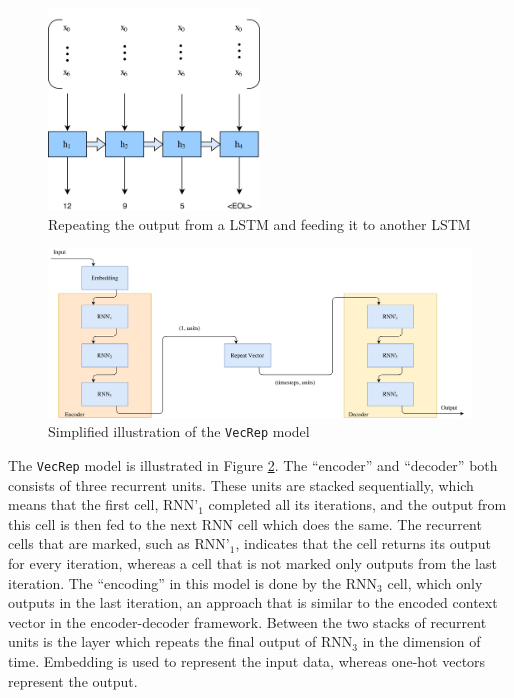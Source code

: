 \begin{figure}[ht]
    \centering
    \includegraphics[width=0.5\textwidth]{fig/development_process/lstm-vector-projection-decoder.png}
    \caption{Repeating the output from a LSTM and feeding it to another LSTM}
    \label{fig:lstm-vector-projection-decoder}
\end{figure}

\begin{figure}[!ht]
    \centering
    \includegraphics[width=1\textwidth]{fig/models/vecrep_model.png}
    \caption{Simplified illustration of the {\tt VecRep} model}
    \label{fig:vecrep_model}
\end{figure}

The {\tt VecRep} model is illustrated in Figure \ref{fig:vecrep_model}. The ``encoder'' and ``decoder'' both consists of three recurrent units. These units are stacked sequentially, which means that the first cell, \(\text{RNN'}_1\) completed all its iterations, and the output from this cell is then fed to the next RNN cell which does the same. The recurrent cells that are marked, such as \(\text{RNN'}_1\), indicates that the cell returns its output for every iteration, whereas a cell that is not marked only outputs from the last iteration. The ``encoding'' in this model is done by the \(\text{RNN}_3\) cell, which only outputs in the last iteration, an approach that is similar to the encoded context vector in the encoder-decoder framework. Between the two stacks of recurrent units is the layer which repeats the final output of \(\text{RNN}_3\) in the dimension of time. Embedding is used to represent the input data, whereas one-hot vectors represent the output. 

